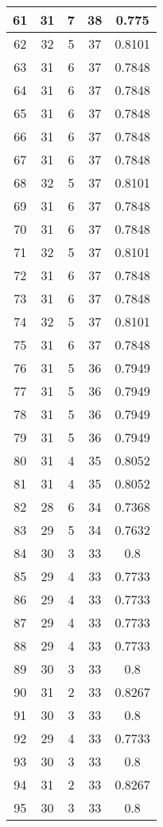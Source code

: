 \documentclass[letterpaper, 12pt]{article}
\begin{document}
\begin{longtable}{|c|c|c|c|c|}
61 & 31 & 7 & 38 & 0.775 \\
\hline
62 & 32 & 5 & 37 & 0.8101 \\
\hline
63 & 31 & 6 & 37 & 0.7848 \\
\hline
64 & 31 & 6 & 37 & 0.7848 \\
\hline
65 & 31 & 6 & 37 & 0.7848 \\
\hline
66 & 31 & 6 & 37 & 0.7848 \\
\hline
67 & 31 & 6 & 37 & 0.7848 \\
\hline
68 & 32 & 5 & 37 & 0.8101 \\
\hline
69 & 31 & 6 & 37 & 0.7848 \\
\hline
70 & 31 & 6 & 37 & 0.7848 \\
\hline
71 & 32 & 5 & 37 & 0.8101 \\
\hline
72 & 31 & 6 & 37 & 0.7848 \\
\hline
73 & 31 & 6 & 37 & 0.7848 \\
\hline
74 & 32 & 5 & 37 & 0.8101 \\
\hline
75 & 31 & 6 & 37 & 0.7848 \\
\hline
76 & 31 & 5 & 36 & 0.7949 \\
\hline
77 & 31 & 5 & 36 & 0.7949 \\
\hline
78 & 31 & 5 & 36 & 0.7949 \\
\hline
79 & 31 & 5 & 36 & 0.7949 \\
\hline
80 & 31 & 4 & 35 & 0.8052 \\
\hline
81 & 31 & 4 & 35 & 0.8052 \\
\hline
82 & 28 & 6 & 34 & 0.7368 \\
\hline
83 & 29 & 5 & 34 & 0.7632 \\
\hline
84 & 30 & 3 & 33 & 0.8 \\
\hline
85 & 29 & 4 & 33 & 0.7733 \\
\hline
86 & 29 & 4 & 33 & 0.7733 \\
\hline
87 & 29 & 4 & 33 & 0.7733 \\
\hline
88 & 29 & 4 & 33 & 0.7733 \\
\hline
89 & 30 & 3 & 33 & 0.8 \\
\hline
90 & 31 & 2 & 33 & 0.8267 \\
\hline
91 & 30 & 3 & 33 & 0.8 \\
\hline
92 & 29 & 4 & 33 & 0.7733 \\
\hline
93 & 30 & 3 & 33 & 0.8 \\
\hline
94 & 31 & 2 & 33 & 0.8267 \\
\hline
95 & 30 & 3 & 33 & 0.8 \\

\end{longtable}
\end{document}
